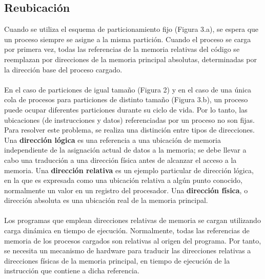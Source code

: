 \documentclass[12pt,a4paper]{article}
\begin{document}
\subsection{Reubicación}
Cuando se utiliza el esquema de particionamiento fijo (Figura 3.a), se espera que un proceso siempre se asigne a la misma partición. Cuando el proceso se carga por primera vez, todas las referencias de la memoria relativas del código se reemplazan por direcciones de la memoria principal absolutas, determinadas por la dirección base del proceso cargado.\\\\ 
En el caso de particiones de igual tamaño (Figura 2) y en el caso de una única cola de procesos para particiones de distinto tamaño (Figura 3.b), un proceso puede ocupar diferentes particiones durante su ciclo de vida. Por lo tanto, las ubicaciones (de instrucciones y datos) referenciadas por un proceso no son fijas. Para resolver este problema, se realiza una distinción entre tipos de direcciones. Una \textbf{dirección lógica} es una referencia a una ubicación de memoria independiente de la asignación actual de datos a la memoria; se debe llevar a cabo una traducción a una dirección física antes de alcanzar el acceso a la memoria. Una \textbf{dirección relativa} es un ejemplo particular de dirección lógica, en la que es expresada como una ubicación relativa a algún punto conocido, normalmente un valor en un registro del procesador. Una \textbf{dirección física}, o dirección absoluta es una ubicación real de la memoria principal. \\\\ 
Los programas que emplean direcciones relativas de memoria se cargan utilizando carga dinámica en tiempo de ejecución. Normalmente, todas las referencias de memoria de los procesos cargados son relativas al origen del programa. Por tanto, se necesita un mecanismo de hardware para traducir las direcciones relativas a direcciones físicas de la memoria principal, en tiempo de ejecución de la instrucción que contiene a dicha referencia. \\\\ 
\end{document}
